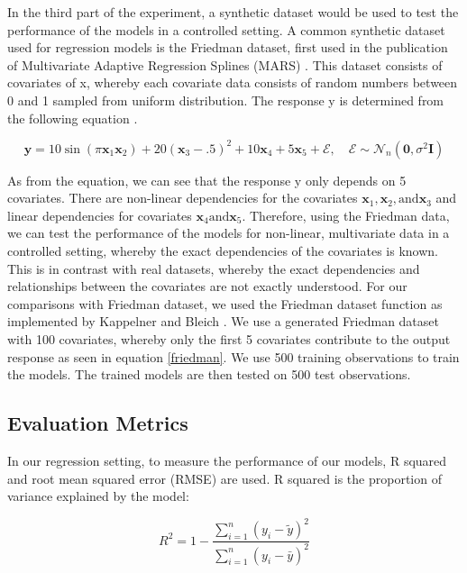 \documentclass{usiinftr}
\begin{document}
In the third part of the experiment, a synthetic dataset would be used to test the performance of the models in a controlled setting. A common synthetic dataset used for regression models is the Friedman dataset, first used in the publication of Multivariate Adaptive Regression Splines (MARS) \cite{33}. This dataset consists of covariates of x, whereby each covariate data consists of random numbers between 0 and 1 sampled from uniform distribution. The response y is determined from the following equation \cite{33}\cite{34}.

\begin{equation}\label{friedman}
\boldsymbol{y}=10 \sin \left(\pi \boldsymbol{x}_{1} \boldsymbol{x}_{2}\right)+20\left(\boldsymbol{x}_{3}-.5\right)^{2}+10 \boldsymbol{x}_{4}+5 \boldsymbol{x}_{5}+\mathcal{E}, \quad \mathcal{E} \sim \mathcal{N}_{n}\left(\mathbf{0}, \sigma^{2} \boldsymbol{I}\right)
\end{equation}

As from the equation, we can see that the response y only depends on 5 covariates. There are non-linear dependencies for the covariates $\boldsymbol{x}_{1}, \boldsymbol{x}_{2}, \text{
and} \boldsymbol{x}_{3}$ and linear dependencies for covariates $\boldsymbol{x}_{4} \text{
and} \boldsymbol{x}_{5}$. Therefore, using the Friedman data, we can test the performance of the models for non-linear, multivariate data in a controlled setting, whereby the exact dependencies of the covariates is known. This is in contrast with real datasets, whereby the exact dependencies and relationships between the covariates are not exactly understood. For our comparisons with Friedman dataset, we used the Friedman dataset function as implemented by Kappelner and Bleich \cite{14}. We use a generated Friedman dataset with 100 covariates, whereby only the first 5 covariates contribute to the output response as seen in equation \ref{friedman}. We use 500 training observations to train the models. The trained models are then tested on 500 test observations.

\subsection{Evaluation Metrics}
In our regression setting, to measure the performance of our models, R squared and root mean squared error (RMSE) are used. R squared is the proportion of variance explained by the model: 

\begin{equation}
R^{2}=1-\frac{\sum_{i=1}^{n}\left(y_{i}-\tilde{y}\right)^{2}}{\sum_{i=1}^{n}\left(y_{i}-\bar{y}\right)^{2}}
\end{equation}
\end{document}
